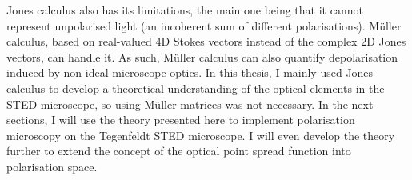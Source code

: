 Jones calculus also has its limitations, the main one being that it cannot represent unpolarised light (an incoherent sum of different polarisations). Müller calculus, based on real-valued 4D Stokes vectors instead of the complex 2D Jones vectors, can handle it. As such, Müller calculus can also quantify depolarisation induced by non-ideal microscope optics. In this thesis, I mainly used Jones calculus to develop a theoretical understanding of the optical elements in the STED microscope, so using Müller matrices was not necessary. In the next sections, I will use the theory presented here to implement polarisation microscopy on the Tegenfeldt STED microscope. I will even develop the theory further to extend the concept of the optical point spread function into polarisation space.
